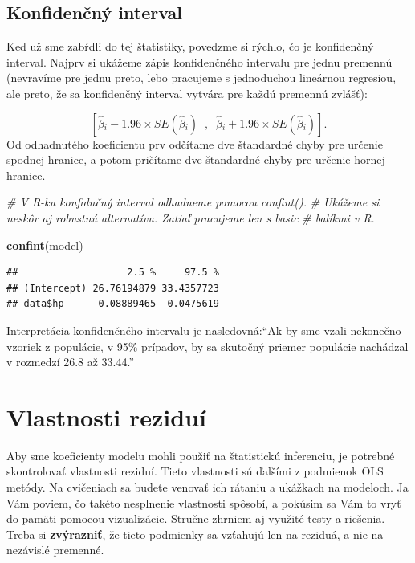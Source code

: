 \documentclass[]{article}
\newenvironment{Shaded}{\begin{snugshade}}{\end{snugshade}}
\newcommand{\CommentTok}[1]{\textcolor[rgb]{0.56,0.35,0.01}{\textit{#1}}}
\newcommand{\KeywordTok}[1]{\textcolor[rgb]{0.13,0.29,0.53}{\textbf{#1}}}
\newcommand{\NormalTok}[1]{#1}
\begin{document}
\hypertarget{konfidenux10dnuxfd-interval}{%
\subsection{Konfidenčný interval}\label{konfidenux10dnuxfd-interval}}

Keď už sme zabŕdli do tej štatistiky, povedzme si rýchlo, čo je
konfidenčný interval. Najprv si ukážeme zápis konfidenčného intervalu
pre jednu premennú (nevravíme pre jednu preto, lebo pracujeme s
jednoduchou lineárnou regresiou, ale preto, že sa konfidenčný interval
vytvára pre každú premennú zvlášť):

\[[\hat\beta{}_i - 1.96 × SE(\hat\beta{}_i)\;\;,\;\;\hat\beta{}_i + 1.96 × SE(\hat\beta{}_i)].\]
Od odhadnutého koeficientu prv odčítame dve štandardné chyby pre určenie
spodnej hranice, a potom pričítame dve štandardné chyby pre určenie
hornej hranice.

\begin{Shaded}
\begin{Highlighting}[]
\CommentTok{# V R-ku konfidnčný interval odhadneme pomocou confint().}
\CommentTok{# Ukážeme si neskôr aj robustnú alternatívu. Zatiaľ pracujeme len s basic}
\CommentTok{# balíkmi v R.}

\KeywordTok{confint}\NormalTok{(model)}
\end{Highlighting}
\end{Shaded}

\begin{verbatim}
##                   2.5 %     97.5 %
## (Intercept) 26.76194879 33.4357723
## data$hp     -0.08889465 -0.0475619
\end{verbatim}

Interpretácia konfidenčného intervalu je nasledovná:``Ak by sme vzali
nekonečno vzoriek z populácie, v 95\% prípadov, by sa skutočný priemer
populácie nachádzal v rozmedzí 26.8 až 33.44.''

\hypertarget{vlastnosti-reziduuxed}{%
\section{Vlastnosti reziduí}\label{vlastnosti-reziduuxed}}

Aby sme koeficienty modelu mohli použiť na štatistickú inferenciu, je
potrebné skontrolovať vlastnosti reziduí. Tieto vlastnosti sú ďalšími z
podmienok OLS metódy. Na cvičeniach sa budete venovať ich rátaniu a
ukážkach na modeloch. Ja Vám poviem, čo takéto nesplnenie vlastnosti
spôsobí, a pokúsim sa Vám to vryť do pamäti pomocou vizualizácie.
Stručne zhrniem aj využité testy a riešenia. Treba si
\textbf{zvýrazniť}, že tieto podmienky sa vzťahujú len na reziduá, a nie
na nezávislé premenné.
\end{document}
